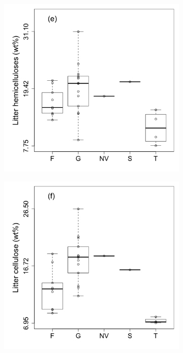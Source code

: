 \documentclass{article}
\begin{document}
\begin{figure}
\begin{subfigure}[!ht]{0.3\textwidth}
	\end{subfigure}
	\begin{subfigure}[!ht]{0.3\textwidth}
		\includegraphics[width=\textwidth]{figs/HC_boxplot.png}
	\end{subfigure}
	\begin{subfigure}[!ht]{0.3\textwidth}
		\includegraphics[width=\textwidth]{figs/CL_boxplot.png}

\end{subfigure}
\end{figure}
\end{document}
